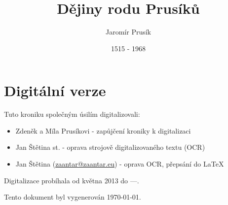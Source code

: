 \documentclass[titlepage]{book}
\title{Dějiny rodu Prusíků}
\author{Jaromír Prusík}
\date{1515 - 1968}
\begin{document}
\frontmatter

\maketitle

\mainmatter


















\appendix

\tableofcontents

\chapter{Digitální verze}

Tuto kroniku společným úsilím digitalizovali:
\begin{itemize}
\item Zdeněk a Míla Prusíkovi - zapůjčení kroniky k digitalizaci
\item Jan Štětina st. - oprava strojově digitalizovaného textu (OCR)
\item Jan Štětina (\href{mailto:zaantar@zaantar.eu}{zaantar@zaantar.eu}) - oprava OCR, přepsání do \LaTeX
\end{itemize}

Digitalizace probíhala od května 2013 do ---. 

Tento dokument byl vygenerován \today.

\backmatter
\end{document}
